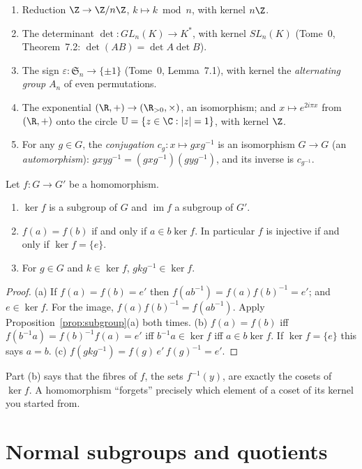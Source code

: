 \begin{example}\label{ex:homs}
\begin{enumerate}[label=(\arabic*)]
\item Reduction $\Z\to\Z/n\Z$, $k\mapsto k\bmod n$, with kernel $n\Z$.
\item The determinant $\det:GL_n(K)\to K^*$, with kernel $SL_n(K)$ (Tome~0, Theorem~7.2: $\det(AB)=\det A\det B$).
\item The sign $\varepsilon:\mathfrak S_n\to\{\pm1\}$ (Tome~0, Lemma~7.1), with kernel the \emph{alternating group} $A_n$ of even permutations.
\item The exponential $(\R,+)\to(\R_{>0},\times)$, an isomorphism; and $x\mapsto e^{2i\pi x}$ from $(\R,+)$ onto the circle $\mathbb U=\{z\in\C:|z|=1\}$, with kernel $\Z$.
\item For any $g\in G$, the \emph{conjugation} $c_g:x\mapsto gxg^{-1}$ is an isomorphism $G\to G$ (an \emph{automorphism}): $gxyg^{-1}=(gxg^{-1})(gyg^{-1})$, and its inverse is $c_{g^{-1}}$.
\end{enumerate}
\end{example}

\begin{proposition}\label{prop:kerim}
Let $f:G\to G'$ be a homomorphism.
\begin{enumerate}[label=(\alph*)]
\item $\ker f$ is a subgroup of $G$ and $\operatorname{im}f$ a subgroup of $G'$.
\item $f(a)=f(b)$ if and only if $a\in b\ker f$. In particular $f$ is injective if and only if $\ker f=\{e\}$.
\item For $g\in G$ and $k\in\ker f$, $gkg^{-1}\in\ker f$.
\end{enumerate}
\end{proposition}
\begin{proof}
(a) If $f(a)=f(b)=e'$ then $f(ab^{-1})=f(a)f(b)^{-1}=e'$; and $e\in\ker f$. For the image, $f(a)f(b)^{-1}=f(ab^{-1})$. Apply Proposition~\ref{prop:subgroup}(a) both times.
(b) $f(a)=f(b)$ iff $f(b^{-1}a)=f(b)^{-1}f(a)=e'$ iff $b^{-1}a\in\ker f$ iff $a\in b\ker f$. If $\ker f=\{e\}$ this says $a=b$.
(c) $f(gkg^{-1})=f(g)\,e'\,f(g)^{-1}=e'$.
\end{proof}

Part (b) says that the fibres of $f$, the sets $f^{-1}(y)$, are exactly the cosets of $\ker f$. A homomorphism ``forgets'' precisely which element of a coset of its kernel you started from.

\section{Normal subgroups and quotients}

